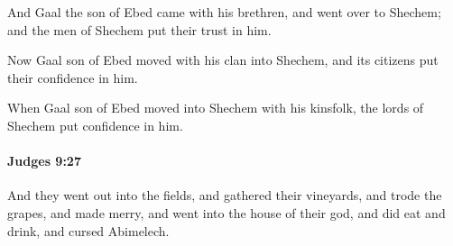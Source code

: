 			\begin{versebox}
					\item[BHS] 
					\item[ASV] And Gaal the son of Ebed came with his brethren, and went over to Shechem; and the men of Shechem put their trust in him.
					\item[NIV] Now Gaal son of Ebed moved with his clan into Shechem, and its citizens put their confidence in him.
					\item[NRSV] When Gaal son of Ebed moved into Shechem with his kinsfolk, the lords of Shechem put confidence in him.
			\end{versebox}

		\paragraph{Judges 9:27} %
			\label{JUDGES-9-27}

			And they went out into the fields, and gathered their vineyards, and trode the grapes, and made merry, and went into the house of their god, and did eat and drink, and cursed Abimelech.

